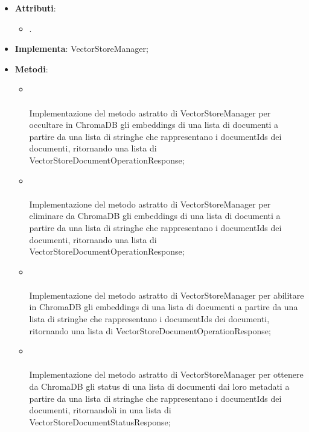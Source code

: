 \documentclass[10pt, a4paper]{article}
\begin{document}
\label{VectorStoreChromaDBManagerDettaglio}
\begin{itemize}
    \item \textbf{Attributi}:
    \begin{itemize}
        \item {}.
    \end{itemize}
    \item \textbf{Implementa}: VectorStoreManager;
    \item \textbf{Metodi}:
    \begin{itemize}
        \item {}\\ \\
        Implementazione del metodo astratto di VectorStoreManager per occultare in ChromaDB gli embeddings di una lista di documenti a partire da una lista di stringhe che rappresentano i documentIds dei documenti, ritornando una lista di VectorStoreDocumentOperationResponse;

        \item {}\\ \\
        Implementazione del metodo astratto di VectorStoreManager per eliminare da ChromaDB gli embeddings di una lista di documenti a partire da una lista di stringhe che rappresentano i documentIds dei documenti, ritornando una lista di VectorStoreDocumentOperationResponse;

        \item {}\\ \\
        Implementazione del metodo astratto di VectorStoreManager per abilitare in ChromaDB gli embeddings di una lista di documenti a partire da una lista di stringhe che rappresentano i documentIds dei documenti, ritornando una lista di VectorStoreDocumentOperationResponse;

        \item {}\\ \\
        Implementazione del metodo astratto di VectorStoreManager per ottenere da ChromaDB gli status di una lista di documenti dai loro metadati a partire da una lista di stringhe che rappresentano i documentIds dei documenti, ritornandoli in una lista di VectorStoreDocumentStatusResponse;      


\end{itemize}
\end{itemize}
\end{document}
